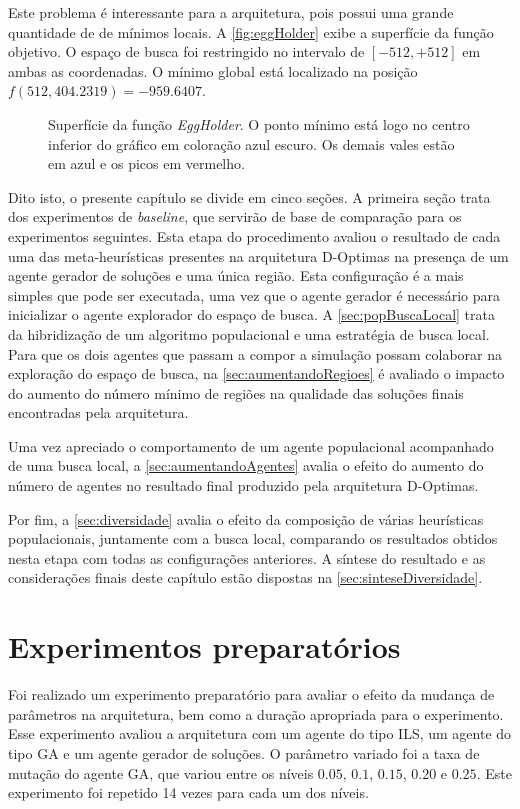 Este problema é interessante para a arquitetura, pois possui uma grande quantidade de de mínimos locais. A \autoref{fig:eggHolder} exibe a superfície da função objetivo. O espaço de busca foi restringido no intervalo de $[-512,+512]$ em ambas as coordenadas. O mínimo global está localizado na posição $f(512, 404.2319) = -959.6407$.   

\begin{figure}
    \centering
    \caption{Superfície da função \textit{EggHolder}. O ponto mínimo está logo no centro inferior do gráfico em coloração azul escuro. Os demais vales estão em azul e os picos em vermelho.}
    
    \label{fig:eggHolder}
\end{figure}

Dito isto, o presente capítulo se divide em cinco seções. A primeira seção trata dos experimentos de \textit{baseline}, que servirão de base de comparação para os experimentos seguintes. Esta etapa do procedimento avaliou o resultado de cada uma das meta-heurísticas presentes na arquitetura D-Optimas na presença de um agente gerador de soluções e uma única região. Esta configuração é a mais simples que pode ser executada, uma vez que o agente gerador é necessário para inicializar o agente explorador do espaço de busca. A \autoref{sec:popBuscaLocal} trata da hibridização de um algoritmo populacional e uma estratégia de busca local. Para que os dois agentes que passam a compor a simulação possam colaborar na exploração do espaço de busca, na \autoref{sec:aumentandoRegioes} é avaliado o impacto do aumento do número mínimo de regiões na qualidade das soluções finais encontradas pela arquitetura.

Uma vez apreciado o comportamento de um agente populacional acompanhado de uma busca local, a \autoref{sec:aumentandoAgentes} avalia o efeito do aumento do número de agentes no resultado final produzido pela arquitetura D-Optimas. 

Por fim, a \autoref{sec:diversidade} avalia o efeito da composição de várias heurísticas populacionais, juntamente com a busca local, comparando os resultados obtidos nesta etapa com todas as configurações anteriores. A síntese do resultado e as considerações finais deste capítulo estão dispostas na \autoref{sec:sinteseDiversidade}.

\section{Experimentos preparatórios}
Foi realizado um experimento preparatório para avaliar o efeito da mudança de parâmetros na arquitetura, bem como a duração apropriada para o experimento. Esse experimento avaliou a arquitetura com um agente do tipo ILS, um agente do tipo GA e um agente gerador de soluções. O parâmetro variado foi a taxa de mutação do agente GA, que variou entre os níveis $0.05$, $0.1$, $0.15$, $0.20$ e $0.25$. Este experimento foi repetido 14 vezes para cada um dos níveis.

